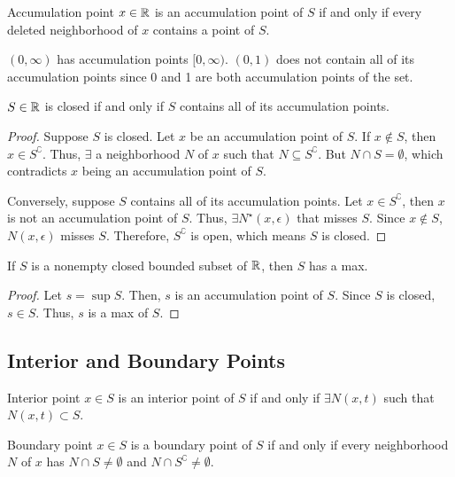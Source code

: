 \begin{definition}{Accumulation point}{}
    $x \in \mathbb{R}$ is an accumulation point of $S$ if and only if every deleted neighborhood of $x$ contains a point of $S$.
\end{definition}
\begin{note}
    $(0, \infty)$ has accumulation points $[0, \infty)$. $(0, 1)$ does not contain all of its accumulation points since 0 and 1 are both accumulation points of the set.
\end{note}

\begin{theorem}{}{}
    $S \in \mathbb{R}$ is closed if and only if $S$ contains all of its accumulation points.
\end{theorem}
\begin{proof}
    Suppose $S$ is closed. Let $x$ be an accumulation point of $S$. If $x \not\in S$, then $x \in S^\complement$. Thus, $\exists$ a neighborhood $N$ of $x$ such that $N \subseteq S^\complement$. But $N \cap S = \emptyset$, which contradicts $x$ being an accumulation point of $S$.

    Conversely, suppose $S$ contains all of its accumulation points. Let $x \in S^\complement$, then $x$ is not an accumulation point of $S$. Thus, $\exists N^\star(x, \epsilon)$ that misses $S$. Since $x \not\in S$, $N(x, \epsilon)$ misses $S$. Therefore, $S^\complement$ is open, which means $S$ is closed.
\end{proof}

\begin{theorem}{}{}
    If $S$ is a nonempty closed bounded subset of $\mathbb{R}$, then $S$ has a max.
\end{theorem}
\begin{proof}
    Let $s = \sup S$. Then, $s$ is an accumulation point of $S$. Since $S$ is closed, $s \in S$. Thus, $s$ is a max of $S$.
\end{proof}

\subsection{Interior and Boundary Points}
\begin{definition}{Interior point}{}
    $x \in S$ is an interior point of $S$ if and only if $\exists N(x, t)$ such that $N(x, t) \subset S$.
\end{definition}

\begin{definition}{Boundary point}{}
    $x \in S$ is a boundary point of $S$ if and only if every neighborhood $N$ of $x$ has $N \cap S \neq \emptyset$ and $N \cap S^\complement \neq \emptyset$.
\end{definition}

